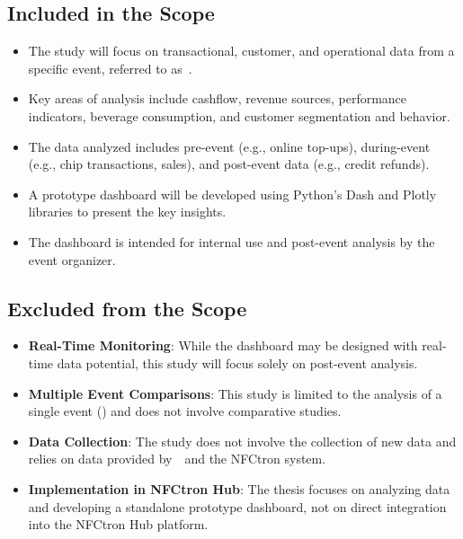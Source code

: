 \subsection*{Included in the Scope}
\label{subsec:introduction-scope-included}
\begin{itemize}
	\item The study will focus on transactional, customer, and operational data from a specific event, referred to as~\theEvent.
	\item Key areas of analysis include cashflow, revenue sources, performance indicators, beverage consumption, and customer segmentation and behavior.
	\item The data analyzed includes pre-event (e.g., online top-ups), during-event (e.g., chip transactions, sales), and post-event data (e.g., credit refunds).
	\item A prototype dashboard will be developed using Python’s Dash and Plotly libraries to present the key insights.
	\item The dashboard is intended for internal use and post-event analysis by the event organizer.
\end{itemize}

\subsection*{Excluded from the Scope}
\label{subsec:introduction-scope-excluded}
\begin{itemize}
	\item \textbf{Real-Time Monitoring}: While the dashboard may be designed with real-time data potential, this study will focus solely on post-event analysis.
	\item \textbf{Multiple Event Comparisons}: This study is limited to the analysis of a single event (\theEvent) and does not involve comparative studies.
	\item \textbf{Data Collection}: The study does not involve the collection of new data and relies on data provided by~\theOrganizer~and the NFCtron system.
	\item \textbf{Implementation in NFCtron Hub}: The thesis focuses on analyzing data and developing a standalone prototype dashboard, not on direct integration into the NFCtron Hub platform.
\end{itemize}

